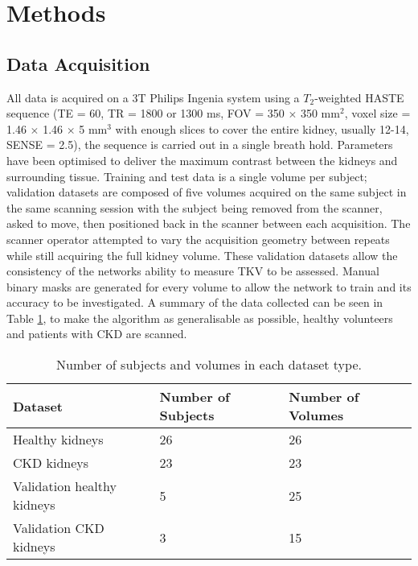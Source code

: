 \newpage
\section{Methods}

\subsection{Data Acquisition}
\label{sec:ml_methods_acquisition}
All data is acquired on a 3T Philips Ingenia system using a $T_2$-weighted \ac{HASTE} sequence (\ac{TE} = 60, \ac{TR} = 1800 or 1300 ms, \ac{FOV} = 350 $\times$ 350 mm$^2$, voxel size = 1.46 $\times$ 1.46 $\times$ 5 mm$^3$ with enough slices to cover the entire kidney, usually 12-14, \ac{SENSE} = 2.5), the sequence is carried out in a single breath hold. Parameters have been optimised to deliver the maximum contrast between the kidneys and surrounding tissue. Training and test data is a single volume per subject; validation datasets are composed of five volumes acquired on the same subject in the same scanning session with the subject being removed from the scanner, asked to move, then positioned back in the scanner between each acquisition. The scanner operator attempted to vary the acquisition geometry between repeats while still acquiring the full kidney volume. These validation datasets allow the consistency of the networks ability to measure \ac{TKV} to be assessed. Manual binary masks are generated for every volume to allow the network to train and its accuracy to be investigated. A summary of the data collected can be seen in Table \ref{tab:ml_data}, to make the algorithm as generalisable as possible, healthy volunteers and patients with \ac{CKD} are scanned.\\

\begin{table}[H]
	\centering
	\begin{tabular}{|l|l|l|}
		\hline
		\textbf{Dataset}           & \textbf{Number of Subjects} & \textbf{Number of Volumes} \\ \hline
		Healthy kidneys            & 26                            & 26                         \\ \hline
		\ac{CKD} kidneys           & 23                            & 23                         \\ \hline
		Validation healthy kidneys & 5                             & 25                         \\ \hline
		Validation \ac{CKD} kidneys& 3                             & 15                         \\ \hline
	\end{tabular}
	\caption{Number of subjects and volumes in each dataset type.}
	\label{tab:ml_data}
\end{table}

